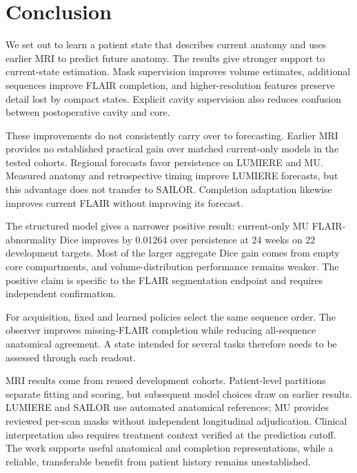 \clearpage
\chapter{Conclusion}
\begingroup
{}
\makeatletter{}\makeatother
{}

We set out to learn a patient state that describes current anatomy and uses earlier MRI to predict future anatomy. The results give stronger support to current-state estimation. Mask supervision improves volume estimates, additional sequences improve FLAIR completion, and higher-resolution features preserve detail lost by compact states. Explicit cavity supervision also reduces confusion between postoperative cavity and core.

These improvements do not consistently carry over to forecasting. Earlier MRI provides no established practical gain over matched current-only models in the tested cohorts. Regional forecasts favor persistence on LUMIERE and MU. Measured anatomy and retrospective timing improve LUMIERE forecasts, but this advantage does not transfer to SAILOR. Completion adaptation likewise improves current FLAIR without improving its forecast.

The structured model gives a narrower positive result: current-only MU FLAIR-abnormality Dice improves by 0.01264 over persistence at 24 weeks on 22 development targets. Most of the larger aggregate Dice gain comes from empty core compartments, and volume-distribution performance remains weaker. The positive claim is specific to the FLAIR segmentation endpoint and requires independent confirmation.

For acquisition, fixed and learned policies select the same sequence order. The observer improves missing-FLAIR completion while reducing all-sequence anatomical agreement. A state intended for several tasks therefore needs to be assessed through each readout.

MRI results come from reused development cohorts. Patient-level partitions separate fitting and scoring, but subsequent model choices draw on earlier results. LUMIERE and SAILOR use automated anatomical references; MU provides reviewed per-scan masks without independent longitudinal adjudication. Clinical interpretation also requires treatment context verified at the prediction cutoff. The work supports useful anatomical and completion representations, while a reliable, transferable benefit from patient history remains unestablished.

\endgroup
